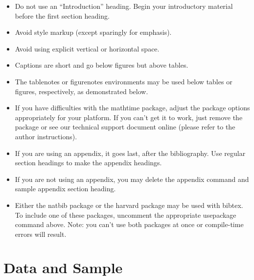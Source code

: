\documentclass[]{AEA}
\begin{document}
\begin{itemize}
\item Do not use an ``Introduction'' heading. Begin your introductory material
before the first section heading.

\item Avoid style markup (except sparingly for emphasis).

\item Avoid using explicit vertical or horizontal space.

\item Captions are short and go below figures but above tables.

\item The tablenotes or figurenotes environments may be used below tables
or figures, respectively, as demonstrated below.

\item If you have difficulties with the mathtime package, adjust the package
options appropriately for your platform. If you can't get it to work, just
remove the package or see our technical support document online (please
refer to the author instructions).

\item If you are using an appendix, it goes last, after the bibliography.
Use regular section headings to make the appendix headings.

\item If you are not using an appendix, you may delete the appendix command
and sample appendix section heading.

\item Either the natbib package or the harvard package may be used with bibtex.
To include one of these packages, uncomment the appropriate usepackage command
above. Note: you can't use both packages at once or compile-time errors will result.

\end{itemize}

\section{Data and Sample} %
\end{document}

